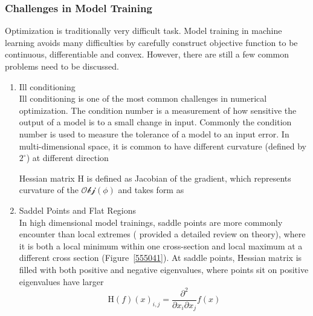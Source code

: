 \subsubsection{Challenges in Model Training}

Optimization is traditionally very difficult task. Model training in machine learning avoids many difficulties by carefully construct objective function to be continuous, differentiable and convex. However, there are still a few common problems need to be discussed. 

\begin{enumerate}
    \item Ill conditioning\\
Ill conditioning is one of the most common challenges in numerical optimization. The condition number is a measurement of how sensitive the output of a model is to a small change in input. Commonly the condition number is used to measure the tolerance of a model to an input error.  In multi-dimensional space, it is common to have different curvature (defined by $2^\circ$) at different direction

Hessian matrix $\mathrm{H}$ is defined as Jacobian of the gradient, which represents curvature of the $\mathcal{Obj}(\phi)$ and takes form as 
    \item Saddel Points and Flat Regions\\
In high dimensional model trainings, saddle points are more commonly encounter than local extremes (\citet{DauphinPGCGB14} provided a detailed review on theory), where it is both a local minimum within one cross-section and local maximum at a different cross section (Figure~\ref{555041}). At saddle points, Hessian matrix is filled with both positive and negative eigenvalues, where points sit on positive eigenvalues have larger
\begin{equation}
    \mathrm{H}(f)(x)_{i,j} = \frac{\partial^2}{\partial x_i \partial x_j}f(x)
\end{equation}
\end{enumerate}

